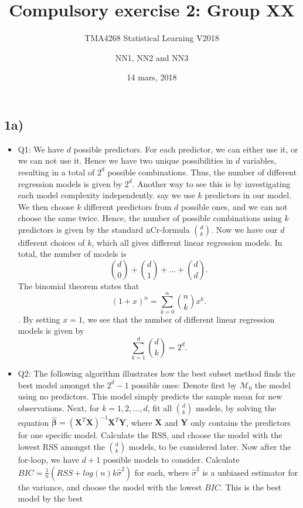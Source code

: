 \documentclass[]{article}
\title{Compulsory exercise 2: Group XX}
\subtitle{TMA4268 Statistical Learning V2018}
\author{NN1, NN2 and NN3}
\date{14 mars, 2018}
\providecommand{\tightlist}{%
  \setlength{\itemsep}{0pt}\setlength{\parskip}{0pt}}
\begin{document}
\maketitle

\subsection{1a)}\label{a}

\begin{itemize}
\tightlist
\item
  Q1: We have \(d\) possible predictors. For each predictor, we can
  either use it, or we can not use it. Hence we have two unique
  possibilities in \(d\) variables, resulting in a total of \(2^d\)
  possible combinations. Thus, the number of different regression models
  is given by \(2^d\). Another way to see this is by investigating each
  model complexity independently. say we use \(k\) predictors in our
  model. We then choose \(k\) different predictors from \(d\) possible
  ones, and we can not choose the same twice. Hence, the number of
  possible combinations using \(k\) predictors is given by the standard
  nCr-formula \(\binom{d}{k}\). Now we have our \(d\) different choices
  of \(k\), which all gives different linear regression models. In
  total, the number of models is
  \[\binom{d}{0}+\binom{d}{1}+\dots+\binom{d}{d}.\] The binomial theorem
  states that \[(1+x)^n=\sum_{k=0}^n \binom{n}{k} x^k.\]. By setting
  \(x=1\), we see that the number of different linear regression models
  is given by \[\sum_{k=1}^d \binom{d}{k}=2^d.\]
\item
  Q2: The following algorithm illustrates how the best subset method
  finds the best model amongst the \(2^d-1\) possible ones: Denote first
  by \(\mathcal{M}_0\) the model using no predictors. This model simply
  predicts the sample mean for new observations. Next, for
  \(k=1,2,\dots,d\), fit all \(\binom{d}{k}\) models, by solving the
  equation
  \(\hat{\boldsymbol \beta} =(\boldsymbol X^T \boldsymbol X)^{-1} \boldsymbol X^T \boldsymbol Y\),
  where \(\boldsymbol{X}\) and \(\boldsymbol{Y}\) only contains the
  predictors for one specific model. Calculate the RSS, and choose the
  model with the lowest RSS amongst the \(\binom{d}{k}\) models, to be
  considered later. Now after the for-loop, we have \(d+1\) possible
  models to consider. Calculate
  \(BIC=\frac{1}{n}(RSS+log(n)k\hat \sigma^2)\) for each, where
  \(\hat \sigma^2\) is a unbiased estimator for the variance, and choose
  the model with the lowest \(BIC\). This is the best model by the best

\end{itemize}
\end{document}
